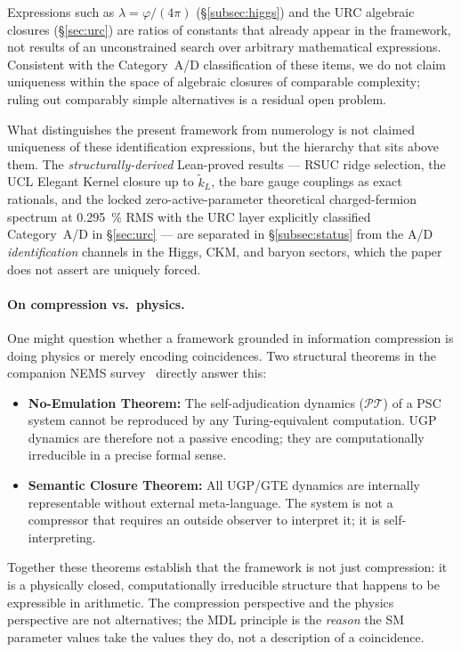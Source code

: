 \documentclass[11pt]{article}
\theoremstyle{remark}
\begin{document}
\smallskip
Expressions such as $\lambda = \varphi/(4\pi)$ (\S\ref{subsec:higgs}) and the URC algebraic closures (\S\ref{sec:urc}) are ratios of constants that already appear in the framework, not results of an unconstrained search over arbitrary mathematical expressions.
Consistent with the Category~A/D classification of these items, we do not claim uniqueness within the space of algebraic closures of comparable complexity; ruling out comparably simple alternatives is a residual open problem.

\smallskip
What distinguishes the present framework from numerology is not claimed uniqueness of these identification expressions, but the hierarchy that sits above them.
The \emph{structurally-derived} Lean-proved results --- RSUC ridge selection, the UCL Elegant Kernel closure up to $\tilde{k}_L$, the bare gauge couplings as exact rationals, and the locked zero-active-parameter theoretical charged-fermion spectrum at \SI{0.295}{\percent} RMS with the URC layer explicitly classified Category~A/D in \S\ref{sec:urc} --- are separated in \S\ref{subsec:status} from the A/D \emph{identification} channels in the Higgs, CKM, and baryon sectors, which the paper does not assert are uniquely forced.

\paragraph{On compression vs.\ physics.}
One might question whether a framework grounded in information compression is doing physics or merely encoding coincidences.
Two structural theorems in the companion NEMS survey~\cite{SpivackNEMS88} directly answer this:
\begin{itemize}[leftmargin=1.2em,itemsep=0.1em]
  \item \textbf{No-Emulation Theorem:} The self-adjudication dynamics ($\mathcal{PT}$) of a PSC system cannot be reproduced by any Turing-equivalent computation.
    UGP dynamics are therefore not a passive encoding; they are computationally irreducible in a precise formal sense.
  \item \textbf{Semantic Closure Theorem:} All UGP/GTE dynamics are internally representable without external meta-language.
    The system is not a compressor that requires an outside observer to interpret it; it is self-interpreting.
\end{itemize}

\smallskip
Together these theorems establish that the framework is not just compression: it is a physically closed, computationally irreducible structure that happens to be expressible in arithmetic.
The compression perspective and the physics perspective are not alternatives; the MDL principle is the \emph{reason} the SM parameter values take the values they do, not a description of a coincidence.
\end{document}
